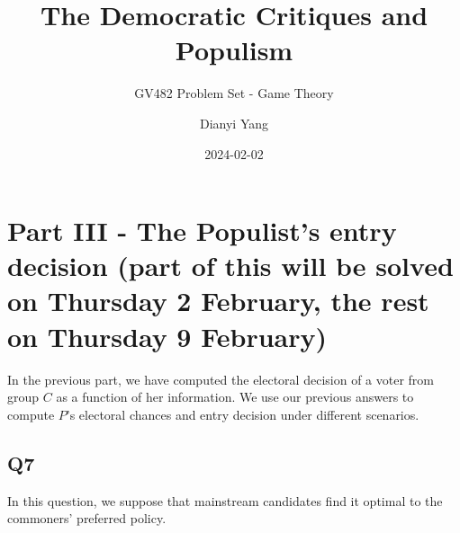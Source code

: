 \documentclass[
  letterpaper,
  abstract=true]{scrartcl}
\title{The Democratic Critiques and Populism}
\subtitle{GV482 Problem Set - Game Theory}
\author{Dianyi Yang\textsuperscript{}}
\date{2024-02-02}
\begin{document}
\maketitle
\ifdefined\Shaded\renewenvironment{Shaded}{\begin{tcolorbox}[frame hidden, sharp corners, breakable, enhanced, interior hidden, boxrule=0pt, borderline west={3pt}{0pt}{shadecolor}]}{\end{tcolorbox}}\fi

\hypertarget{part-iii---the-populists-entry-decision-part-of-this-will-be-solved-on-thursday-2-february-the-rest-on-thursday-9-february}{%
\section{Part III - The Populist's entry decision (part of this will be
solved on Thursday 2 February, the rest on Thursday 9
February)}\label{part-iii---the-populists-entry-decision-part-of-this-will-be-solved-on-thursday-2-february-the-rest-on-thursday-9-february}}

In the previous part, we have computed the electoral decision of a voter
from group \(C\) as a function of her information. We use our previous
answers to compute \(P\)'s electoral chances and entry decision under
different scenarios.

\hypertarget{q7}{%
\subsection{Q7}\label{q7}}

In this question, we suppose that mainstream candidates find it optimal
to the commoners' preferred policy.
\end{document}
